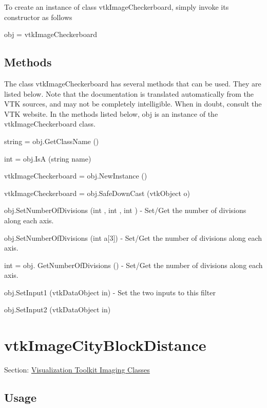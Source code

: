 To create an instance of class vtk\-Image\-Checkerboard, simply invoke its constructor as follows \begin{DoxyVerb}  obj = vtkImageCheckerboard
\end{DoxyVerb}
 \hypertarget{vtkwidgets_vtkxyplotwidget_Methods}{}\subsection{Methods}\label{vtkwidgets_vtkxyplotwidget_Methods}
The class vtk\-Image\-Checkerboard has several methods that can be used. They are listed below. Note that the documentation is translated automatically from the V\-T\-K sources, and may not be completely intelligible. When in doubt, consult the V\-T\-K website. In the methods listed below, {\ttfamily obj} is an instance of the vtk\-Image\-Checkerboard class. 
\begin{DoxyItemize}
\item {\ttfamily string = obj.\-Get\-Class\-Name ()}  
\item {\ttfamily int = obj.\-Is\-A (string name)}  
\item {\ttfamily vtk\-Image\-Checkerboard = obj.\-New\-Instance ()}  
\item {\ttfamily vtk\-Image\-Checkerboard = obj.\-Safe\-Down\-Cast (vtk\-Object o)}  
\item {\ttfamily obj.\-Set\-Number\-Of\-Divisions (int , int , int )} -\/ Set/\-Get the number of divisions along each axis.  
\item {\ttfamily obj.\-Set\-Number\-Of\-Divisions (int a\mbox{[}3\mbox{]})} -\/ Set/\-Get the number of divisions along each axis.  
\item {\ttfamily int = obj. Get\-Number\-Of\-Divisions ()} -\/ Set/\-Get the number of divisions along each axis.  
\item {\ttfamily obj.\-Set\-Input1 (vtk\-Data\-Object in)} -\/ Set the two inputs to this filter  
\item {\ttfamily obj.\-Set\-Input2 (vtk\-Data\-Object in)}  
\end{DoxyItemize}\hypertarget{vtkimaging_vtkimagecityblockdistance}{}\section{vtk\-Image\-City\-Block\-Distance}\label{vtkimaging_vtkimagecityblockdistance}
Section\-: \hyperlink{sec_vtkimaging}{Visualization Toolkit Imaging Classes} \hypertarget{vtkwidgets_vtkxyplotwidget_Usage}{}\subsection{Usage}\label{vtkwidgets_vtkxyplotwidget_Usage}
